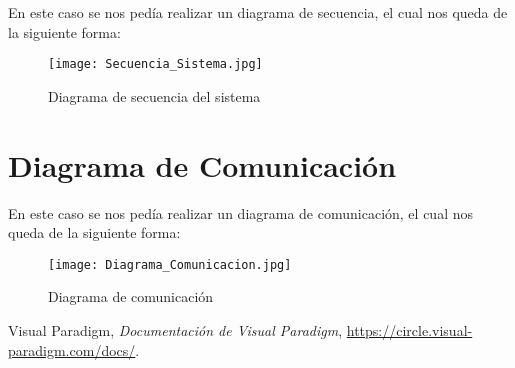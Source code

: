 \documentclass[a4paper,12pt]{article}
\begin{document}
En este caso se nos pedía realizar un diagrama de secuencia, el cual nos queda de la siguiente forma:

\begin{figure}[H]
    \centering
    \texttt{[image: Secuencia\_Sistema.jpg]}
    \caption{Diagrama de secuencia del sistema}
    \label{fig:secuencia_sistema}
\end{figure}

\newpage
\section{Diagrama de Comunicación}

En este caso se nos pedía realizar un diagrama de comunicación, el cual nos queda de la siguiente forma:

\begin{figure}[H]
    \centering
    \texttt{[image: Diagrama\_Comunicacion.jpg]}
    \caption{Diagrama de comunicación}
    \label{fig:comunicacion}
\end{figure}




\newpage
\begin{thebibliography}{99}
Visual Paradigm, \emph{Documentación de Visual Paradigm}, \url{https://circle.visual-paradigm.com/docs/}.
\end{thebibliography}
\end{document}
